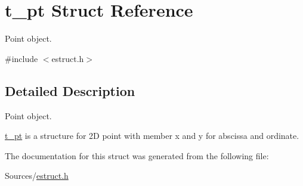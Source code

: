 \hypertarget{structt__pt}{\section{t\-\_\-pt Struct Reference}
\label{structt__pt}
}


Point object.  




{\ttfamily \#include $<$estruct.\-h$>$}



\subsection{Detailed Description}
Point object. 

\hyperlink{structt__pt}{t\-\_\-pt} is a structure for 2\-D point with member x and y for abscissa and ordinate. 

The documentation for this struct was generated from the following file\-:\begin{DoxyCompactItemize}
\item 
Sources/\hyperlink{estruct_8h}{estruct.\-h}\end{DoxyCompactItemize}
